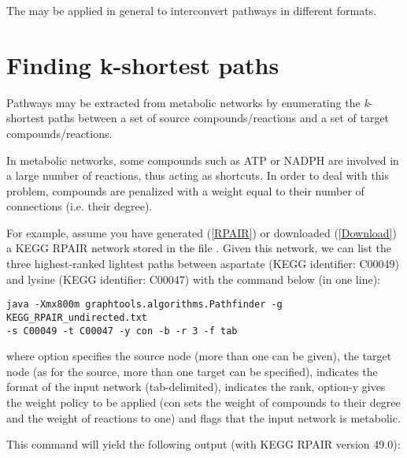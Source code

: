 The  may be applied in general to interconvert pathways
in different formats.

\section{Finding k-shortest paths}

Pathways may be extracted from metabolic networks by enumerating the
\textit{k}-shortest paths between a set of source compounds/reactions and a
set of target compounds/reactions.

In metabolic networks, some compounds such as ATP or NADPH are involved in a
large number of reactions, thus acting as shortcuts. In order to deal with this
problem, compounds are penalized with a weight equal to their number of
connections (i.e. their degree). 

For example, assume you have generated (\ref{RPAIR}) or downloaded
(\ref{Download}) a KEGG RPAIR network stored in the file 
. Given this network, we can list the 
three highest-ranked lightest paths between
aspartate (KEGG identifier: C00049) and lysine (KEGG identifier: C00047) with
the command below (in one line):

\begin{verbatim}
java -Xmx800m graphtools.algorithms.Pathfinder -g KEGG_RPAIR_undirected.txt 
-s C00049 -t C00047 -y con -b -r 3 -f tab
\end{verbatim}

where option  specifies the source node (more than one can be given),
 the target node (as for the source, more than one target can be
specified), indicates the format of the input network
(tab-delimited),  indicates the rank, option{-y} gives the weight policy to be applied
(con sets the weight of compounds to their degree and the weight of reactions
to one) and  flags that the input network is metabolic.

This command will yield the following output (with KEGG RPAIR version 49.0):

